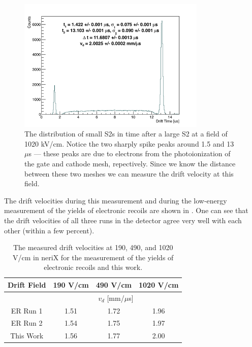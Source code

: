 \begin{figure}[t]
        \centering
	\includegraphics[width=0.8\textwidth]{nerix_drift_velocity}
	\caption{The distribution of small S2s in time after a large S2 at a field of 1020 kV/cm.  Notice the two sharply spike peaks around 1.5 and 13 $\mu$s --- these peaks are due to electrons from the photoionization of the gate and cathode mesh, repectively.  Since we know the distance between these two meshes we can measure the drift velocity at this field.}
	\label{fig:nerix_drift_velocity}
\end{figure}


The drift velocities during this measurement and during the low-energy measurement of the yields of electronic recoils \cite{goetzke2016measurement} are shown in .  One can see that the drift velocities of all three runs in the detector agree very well with each other (within a few percent).

\begin{table}[b]
\centering
\def\arraystretch{1.3}
\begin{tabular}{cccc}
\hline
Drift Field & 190 V/cm & 490 V/cm & 1020 V/cm \\
\hline
 & \multicolumn{3}{c}{$v_d$ [mm/$\mu$s]} \\
\hline
ER Run 1 & 1.51 & 1.72 & 1.96 \\
ER Run 2 & 1.54 & 1.75 & 1.97 \\
This Work & 1.56 & 1.77 & 2.00 \\
\hline
\end{tabular}
\caption{The measured drift velocities at 190, 490, and 1020 V/cm in neriX for the measurement of the yields of electronic recoils \cite{goetzke2016measurement} and this work.}
\label{tab:nerix_drift_velocities}
\end{table}


